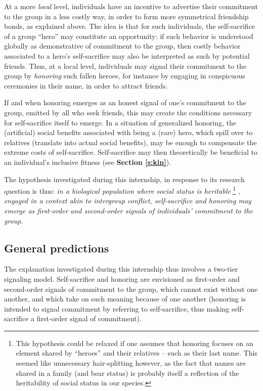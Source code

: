 \documentclass[a4paper,12pt]{report}
\begin{document}
At a more \emph{local} level, individuals have an incentive to advertise their commitment
to the group in a less costly way, in order to form more symmetrical friendship bonds,
as explained above. The idea is that for such individuals, the self-sacrifice of a group
“hero” may constitute an opportunity: if such behavior is understood globally as
demonstrative of commitment to the group, then costly behavior associated to a hero’s
self-sacrifice may also be interpreted as such by potential friends.
Thus, at a local level, individuals may signal their commitment
to the group by \emph{honoring} such fallen heroes, for instance
by engaging in conspicuous ceremonies in their name, in order to attract friends.

If and when honoring emerges as an honest signal of one’s commitment to the group,
emitted by all who seek friends, this may create the conditions necessary
for self-sacrifice itself to emerge. In a situation of generalized honoring,
the (artificial) social benefits associated with being a (rare) hero, which spill
over to relatives (translate into actual social benefits), may be enough to
compensate the extreme costs of self-sacrifice. Self-sacrifice may then theoretically
be beneficial to an individual’s inclusive fitness (see \textbf{Section \ref{s:kin}}).

The hypothesis investigated during this internship, in response to its research
question is thus: \emph{in a biological population where social status is heritable}
\footnote{This hypothesis could be relaxed if one assumes that honoring focuses
on an element shared by “heroes” and their relatives –
such as their last name. This seemed like unnecessary hair-splitting however,
as the fact that names are shared in a family (and bear status) is probably
itself a reflection of the heritability of social 
status in our species.}
\emph{, engaged in a context akin to intergroup conflict, 
self-sacrifice and honoring may emerge as first-order and second-order signals 
of individuals’ commitment to the group.}

\subsection{General predictions}
\label{s:predictions}
The explanation investigated during this internship thus involves a 
two-tier signaling model. Self-sacrifice and honoring are envisioned 
as first-order and second-order signals of commitment to the group, 
which cannot exist without one another, and which take on such meaning 
because of one another (honoring is intended to signal commitment by 
referring to self-sacrifice, thus making self-sacrifice a first-order 
signal of commitment). 
\end{document}
